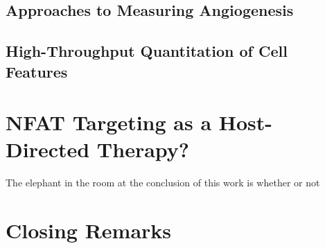\subsection{Approaches to Measuring Angiogenesis}

\subsection{High-Throughput Quantitation of Cell Features}

\citep{Heath2017}


\section{NFAT Targeting as a Host-Directed Therapy?}

The elephant in the room at the conclusion of this work is whether or not 

\citep{Shen2022, Turgut2011}

\section{Closing Remarks}
